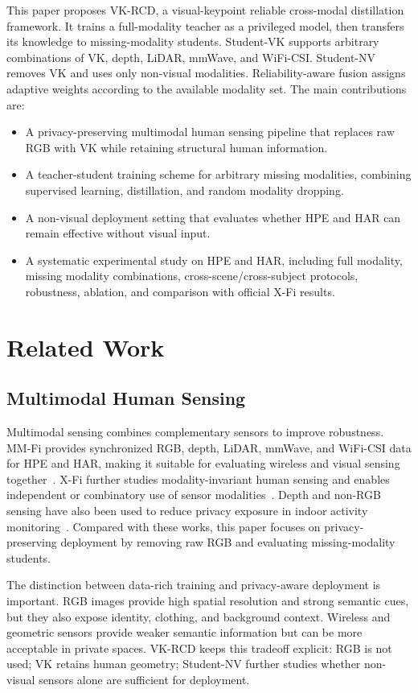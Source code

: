 \documentclass[journal, twocolumn, transmag]{IEEEtran}
\newcommand{\method}{VK-RCD}
\newcommand{\mmfi}{MM-Fi}
\newcommand{\xfi}{X-Fi}
\begin{document}
This paper proposes \method{}, a visual-keypoint reliable cross-modal distillation framework. It trains a full-modality teacher as a privileged model, then transfers its knowledge to missing-modality students. Student-VK supports arbitrary combinations of VK, depth, LiDAR, mmWave, and WiFi-CSI. Student-NV removes VK and uses only non-visual modalities. Reliability-aware fusion assigns adaptive weights according to the available modality set. The main contributions are:
\begin{itemize}
	\item A privacy-preserving multimodal human sensing pipeline that replaces raw RGB with VK while retaining structural human information.
	\item A teacher-student training scheme for arbitrary missing modalities, combining supervised learning, distillation, and random modality dropping.
	\item A non-visual deployment setting that evaluates whether HPE and HAR can remain effective without visual input.
	\item A systematic experimental study on HPE and HAR, including full modality, missing modality combinations, cross-scene/cross-subject protocols, robustness, ablation, and comparison with official \xfi{} results.
\end{itemize}

\section{Related Work}
\subsection{Multimodal Human Sensing}
Multimodal sensing combines complementary sensors to improve robustness. \mmfi{} provides synchronized RGB, depth, LiDAR, mmWave, and WiFi-CSI data for HPE and HAR, making it suitable for evaluating wireless and visual sensing together~\cite{mmfi}. \xfi{} further studies modality-invariant human sensing and enables independent or combinatory use of sensor modalities~\cite{xfi}. Depth and non-RGB sensing have also been used to reduce privacy exposure in indoor activity monitoring~\cite{privacysurvey}. Compared with these works, this paper focuses on privacy-preserving deployment by removing raw RGB and evaluating missing-modality students.

The distinction between data-rich training and privacy-aware deployment is important. RGB images provide high spatial resolution and strong semantic cues, but they also expose identity, clothing, and background context. Wireless and geometric sensors provide weaker semantic information but can be more acceptable in private spaces. \method{} keeps this tradeoff explicit: RGB is not used; VK retains human geometry; Student-NV further studies whether non-visual sensors alone are sufficient for deployment.
\end{document}
